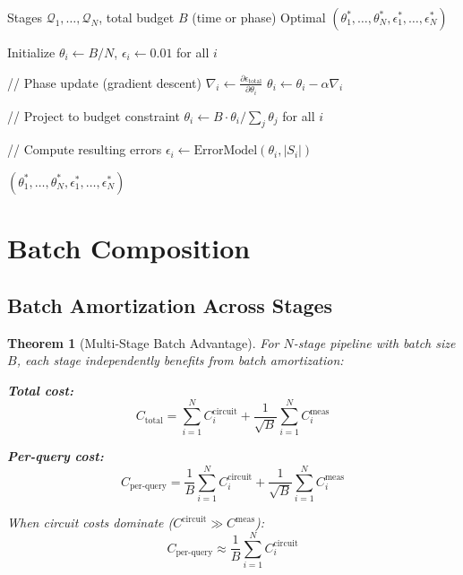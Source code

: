 \documentclass[11pt]{article}
\newtheorem{theorem}{Theorem}
\begin{document}
\begin{algorithm}
\caption{Joint Optimization}
\label{alg:joint_optimization}
\begin{algorithmic}[1]
\REQUIRE Stages $\mathcal{Q}_1, \ldots, \mathcal{Q}_N$, total budget $B$ (time or phase)
\ENSURE Optimal $(\theta_1^*, \ldots, \theta_N^*, \epsilon_1^*, \ldots, \epsilon_N^*)$

\STATE Initialize $\theta_i \leftarrow B/N$, $\epsilon_i \leftarrow 0.01$ for all $i$

\REPEAT
    \STATE // Phase update (gradient descent)
        \STATE $\nabla_i \leftarrow \frac{\partial \epsilon_{\text{total}}}{\partial \theta_i}$
        \STATE $\theta_i \leftarrow \theta_i - \alpha \nabla_i$
    \ENDFOR
    
    \STATE // Project to budget constraint
    \STATE $\theta_i \leftarrow B \cdot \theta_i / \sum_j \theta_j$ for all $i$
    
    \STATE // Compute resulting errors
        \STATE $\epsilon_i \leftarrow \text{ErrorModel}(\theta_i, |S_i|)$
    \ENDFOR
    

\RETURN $(\theta_1^*, \ldots, \theta_N^*, \epsilon_1^*, \ldots, \epsilon_N^*)$
\end{algorithmic}
\end{algorithm}

\section{Batch Composition}
\label{sec:batch}

\subsection{Batch Amortization Across Stages}

\begin{theorem}[Multi-Stage Batch Advantage]
\label{thm:multistage_batch}
For $N$-stage pipeline with batch size $B$, each stage independently benefits from batch amortization:

\textbf{Total cost:}
\begin{equation}
C_{\text{total}} = \sum_{i=1}^N C_i^{\text{circuit}} + \frac{1}{\sqrt{B}} \sum_{i=1}^N C_i^{\text{meas}}
\end{equation}

\textbf{Per-query cost:}
\begin{equation}
C_{\text{per-query}} = \frac{1}{B}\sum_{i=1}^N C_i^{\text{circuit}} + \frac{1}{\sqrt{B}} \sum_{i=1}^N C_i^{\text{meas}}
\end{equation}

When circuit costs dominate ($C^{\text{circuit}} \gg C^{\text{meas}}$):
\begin{equation}
C_{\text{per-query}} \approx \frac{1}{B}\sum_{i=1}^N C_i^{\text{circuit}}
\end{equation}
\end{theorem}
\end{document}
